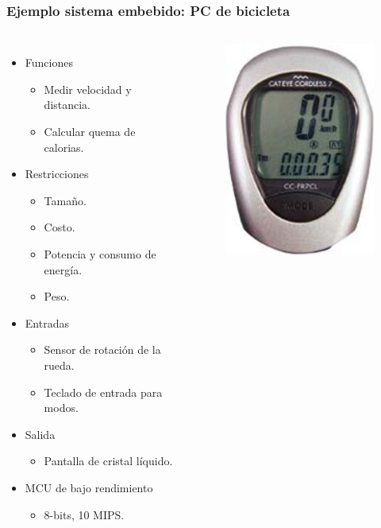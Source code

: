 \documentclass[10.5pt,scale=1.0,t,aspectratio=169,hyperref={pdfpagelabels=false}]{beamer}
\begin{document}
\begin{frame}
	\frametitle{Ejemplo sistema embebido: PC de bicicleta}
	\begin{columns}
		\begin{itemize}
			\item \textcolor{BlueLight}{Funciones}
			\begin{itemize}
				\item Medir velocidad y distancia.
				\item Calcular quema de calorias.
			\end{itemize}
			\item \textcolor{BlueLight}{Restricciones}
			\begin{itemize}
				\item Tamaño.
				\item Costo.
				\item Potencia y consumo de energía.
				\item Peso.
			\end{itemize}
			\item \textcolor{BlueLight}{Entradas}
			\begin{itemize}
				\item Sensor de rotación de la rueda.
				\item Teclado de entrada para modos.
			\end{itemize}
			\item \textcolor{BlueLight}{Salida}
			\begin{itemize}
				\item Pantalla de cristal líquido.
			\end{itemize}
			\item \textcolor{BlueLight}{MCU de bajo rendimiento}
			\begin{itemize}
				\item 8-bits, 10 MIPS.
			\end{itemize}
		\end{itemize}
		
		\begin{figure}
			\centering
			\includegraphics[scale=0.7]{BikePC}
		\end{figure}		
	\end{columns}
\end{frame}
\end{document}
